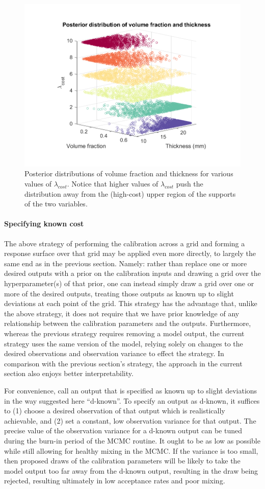 \documentclass{article}
\begin{document}
\begin{figure}
\centering
\captionsetup{width=.7\linewidth}
\includegraphics[width=.65\linewidth]{FIG_post_dist_across_cost_lambda-3d}
\caption{Posterior distributions of volume fraction and thickness for various values of $\lambda_{cost}.$ Notice that higher values of $\lambda_{cost}$ push the distribution away from the (high-cost) upper region of the supports of the two variables.}
\label{fig:post_dists_lambda_cost}
\end{figure}


\paragraph{Specifying known cost}\label{known_cost}

The above strategy of performing the calibration across a grid and forming a response surface over that grid may be applied even more directly, to largely the same end as in the previous section. Namely: rather than replace one or more desired outputs with a prior on the calibration inputs and drawing a grid over the hyperparameter(s) of that prior, one can instead simply draw a grid over one or more of the desired outputs, treating those outputs as known up to slight deviations at each point of the grid. This strategy has the advantage that, unlike the above strategy, it does not require that we have prior knowledge of any relationship between the calibration parameters and the outputs. Furthermore, whereas the previous strategy requires removing a model output, the current strategy uses the same version of the model, relying solely on changes to the desired observations and observation variance to effect the strategy. In comparison with the previous section's strategy, the approach in the current section also enjoys better interpretability.

For convenience, call an output that is specified as known up to slight deviations in the way suggested here ``d-known''. To specify an output as d-known, it suffices to (1) choose a desired observation of that output which is realistically achievable, and (2) set a constant, low observation variance for that output. The precise value of the observation variance for a d-known output can be tuned during the burn-in period of the MCMC routine. It ought to be as low as possible while still allowing for healthy mixing in the MCMC. If the variance is too small, then proposed draws of the calibration parameters will be likely to take the model output too far away from the d-known output, resulting in the draw being rejected, resulting ultimately in low acceptance rates and poor mixing.
\end{document}
